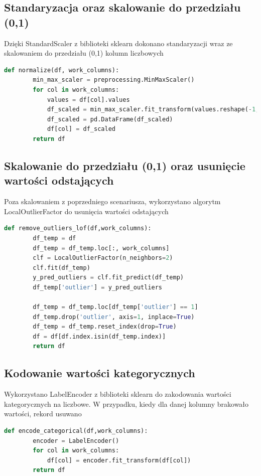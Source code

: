 \documentclass{book}
\begin{document}
\subsection{Standaryzacja oraz skalowanie do przedziału (0,1)}
Dzięki StandardScaler z biblioteki sklearn dokonano 
standaryzacji wraz ze skalowaniem do przedziału (0,1) 
kolumn liczbowych

\begin{lstlisting}[language=Python, caption={Skalowanie do 
    przedziału (0,1)}, captionpos=b]
    def normalize(df, work_columns):
        min_max_scaler = preprocessing.MinMaxScaler()
        for col in work_columns:
            values = df[col].values
            df_scaled = min_max_scaler.fit_transform(values.reshape(-1, 1)) 
            df_scaled = pd.DataFrame(df_scaled)
            df[col] = df_scaled
        return df
\end{lstlisting}

\subsection{Skalowanie do przedziału (0,1) oraz usunięcie 
wartości odstających}
Poza skalowaniem z poprzedniego scenariusza, 
wykorzystano algorytm LocalOutlierFactor do usunięcia 
wartości odstających

\begin{lstlisting}[language=Python, caption={Usuwanie wartości 
    odstających}, captionpos=b]
    def remove_outliers_lof(df,work_columns):
        df_temp = df
        df_temp = df_temp.loc[:, work_columns]
        clf = LocalOutlierFactor(n_neighbors=2)
        clf.fit(df_temp)
        y_pred_outliers = clf.fit_predict(df_temp)
        df_temp['outlier'] = y_pred_outliers

        df_temp = df_temp.loc[df_temp['outlier'] == 1]
        df_temp.drop('outlier', axis=1, inplace=True)
        df_temp = df_temp.reset_index(drop=True)
        df = df[df.index.isin(df_temp.index)]
        return df
\end{lstlisting}

\subsection{Kodowanie wartości kategorycznych}
Wykorzystano LabelEncoder z biblioteki sklearn do 
zakodowania wartości kategorycznych na liczbowe. 
W przypadku, kiedy dla danej kolumny brakowało wartości, 
rekord usuwano

\begin{lstlisting}[language=Python, caption={Usuwanie wartości 
    odstających}, captionpos=b]
    def encode_categorical(df,work_columns):
        encoder = LabelEncoder()
        for col in work_columns:
            df[col] = encoder.fit_transform(df[col])
        return df
\end{lstlisting}
\end{document}
